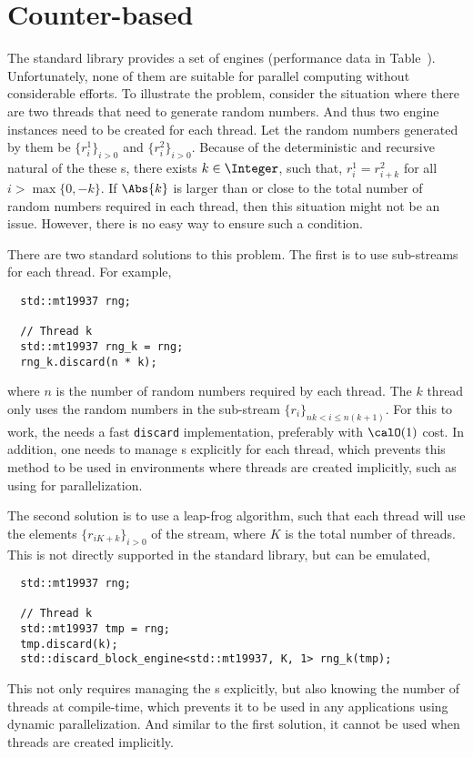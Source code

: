 \section{Counter-based \protect\rng}
\label{sec:Counter-based RNG}

The standard library provides a set of \rng engines (performance data in
Table~). Unfortunately, none of
them are suitable for parallel computing without considerable efforts. To
illustrate the problem, consider the situation where there are two threads that
need to generate random numbers. And thus two \rng engine instances need to be
created for each thread. Let the random numbers generated by them be
$\{r_i^1\}_{i>0}$ and $\{r_i^2\}_{i>0}$. Because of the deterministic and
recursive natural of the these \rng{}s, there exists $k\in\Integer$, such that,
$r_i^1 = r_{i + k}^2$ for all $i > \max\{0, -k\}$. If $\Abs{k}$ is larger than
or close to the total number of random numbers required in each thread, then
this situation might not be an issue. However, there is no easy way to ensure
such a condition.

There are two standard solutions to this problem. The first is to use
sub-streams for each thread. For example,
\begin{Verbatim}
  std::mt19937 rng;

  // Thread k
  std::mt19937 rng_k = rng;
  rng_k.discard(n * k);
\end{Verbatim}
where $n$ is the number of random numbers required by each thread. The $k$\ith
thread only uses the random numbers in the sub-stream $\{r_i\}_{nk < i \le
  n(k+1)}$. For this to work, the \rng needs a fast \verb|discard|
implementation, preferably with $\calO(1)$ cost. In addition, one needs to
manage \rng{}s explicitly for each thread, which prevents this method to be
used in environments where threads are created implicitly, such as using \tbb
for parallelization.

The second solution is to use a leap-frog algorithm, such that each thread will
use the elements $\{r_{iK + k}\}_{i>0}$ of the stream, where $K$ is the total
number of threads. This is not directly supported in the standard library, but
can be emulated,
\begin{Verbatim}
  std::mt19937 rng;

  // Thread k
  std::mt19937 tmp = rng;
  tmp.discard(k);
  std::discard_block_engine<std::mt19937, K, 1> rng_k(tmp);
\end{Verbatim}
This not only requires managing the \rng{}s explicitly, but also knowing the
number of threads at compile-time, which prevents it to be used in any
applications using dynamic parallelization. And similar to the first solution,
it cannot be used when threads are created implicitly.

